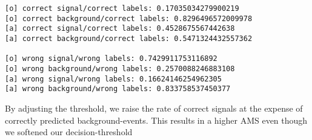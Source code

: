\par\vspace{1\smallerfontscale}%
    \begin{addmargin}[\cellleftmargin]{0em}%
    {\smaller%
    \vspace{-1\smallerfontscale}%
    
    \begin{Verbatim}[commandchars=\\\{\}]
[o] correct signal/correct labels: 0.17035034279900219
[o] correct background/correct labels: 0.8296496572009978
[a] correct signal/correct labels: 0.4528675567442638
[a] correct background/correct labels: 0.5471324432557362

[o] wrong signal/wrong labels: 0.7429911753116892
[o] wrong background/wrong labels: 0.2570088246883108
[a] wrong signal/wrong labels: 0.16624146254962305
[a] wrong background/wrong labels: 0.833758537450377
    \end{Verbatim}
}%
    \end{addmargin}%
    By adjusting the threshold, we raise the rate of correct signals at the
expense of correctly predicted background-events. This results in a
higher AMS even though we softened our decision-threshold


